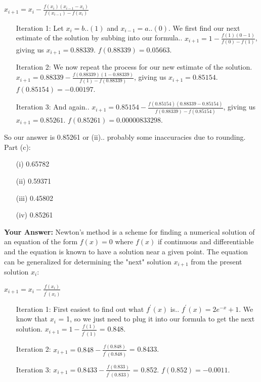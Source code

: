 \documentclass[12pt,a4paper]{report}
\begin{document}
\begin{center}
$x_{i+1} = x_i - \frac{f(x_i)(x_{i-1}-x_i)}{f(x_{i-1})-f(x_i)}$
\end{center}
\begin{itemize}
\item[Iteration 1:] Let $x_i = b..(1)$ and $x_{i-1} = a..(0)$. We first find our next estimate of the solution by subbing into our formula.. $x_{i+1} = 1 - \frac{f(1)(0-1)}{f(0)-f(1)}$, giving us $x_{i+1} = 0.88339$. $f(0.88339) = 0.05663$.
\item[Iteration 2:] We now repeat the process for our new estimate of the solution. $x_{i+1} = 0.88339 - \frac{f(0.88339)(1-0.88339)}{f(1)-f(0.88339)}$, giving us $x_{i+1} = 0.85154$. $f(0.85154) = -0.00197$.
\item[Iteration 3:] And again.. $x_{i+1} = 0.85154 - \frac{f(0.85154)(0.88339-0.85154)}{f(0.88339)-f(0.85154)}$, giving us $x_{i+1} = 0.85261$. $f(0.85261) = 0.00000833298$.
\end{itemize}
So our answer is 0.85261 or (ii).. probably some inaccuracies due to rounding.
\newline
\newline
\newline
Part (c):
\begin{itemize}
\item[(i)] 0.65782
\item[(ii)] 0.59371
\item[(iii)] 0.45802
\item[(iv)] 0.85261
\end{itemize}
\textbf{Your Answer:}
\newline
Newton's method is a scheme for finding a numerical solution of an equation of the form $f(x) = 0 $ where $f(x)$ if continuous and differentiable and the equation is known to have a solution near a given point. The equation can be generalized for determining the "next" solution $x_{i+1}$ from the present solution $x_i$:
\begin{center}
$x_{i+1} = x_i - \frac{f(x_i)}{f^\prime(x_i)}$
\end{center}
\begin{itemize}
\item[Iteration 1:] First easiest to find out what $f^\prime(x)$ is.. $f^\prime(x) = 2e^{-x} + 1$. We know that $x_i$ = 1, so we just need to plug it into our formula to get the next solution. $x_{i+1} = 1 - \frac{f(1)}{f^\prime(1)}$ = 0.848.
\item[Iteration 2:] $x_{i+1} = 0.848 - \frac{f(0.848)}{f^\prime(0.848)}$ = 0.8433.
\item[Iteration 3:] $x_{i+1} = 0.8433 - \frac{f(0.833)}{f^\prime(0.833)}$ = 0.852. $f(0.852) = -0.0011$.
\end{itemize}
\end{document}
